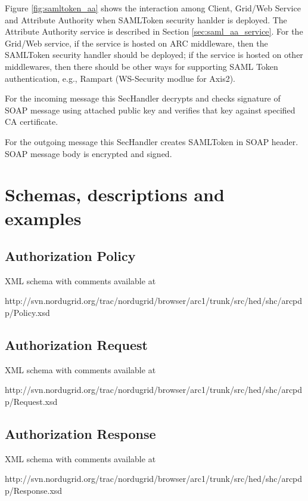 \documentclass{article}                            %
\begin{document}
Figure \ref{fig:samltoken_aa} shows the interaction among Client, Grid/Web Service and Attribute Authority when SAMLToken security hanlder is deployed. The Attribute Authority service is described in Section \ref{sec:saml_aa_service}. For the Grid/Web service, if the service is hosted on ARC middleware, then the SAMLToken security handler should be deployed; if the service is hosted on other middlewares, then there should be other ways for supporting SAML Token authentication, e.g., Rampart (WS-Security modlue for Axis2).

For the incoming message this SecHandler decrypts and checks signature of SOAP message using attached public key and verifies that key against specified CA certificate.

For the outgoing message this SecHandler creates SAMLToken in SOAP header. SOAP message body is encrypted and signed.




\section{Schemas, descriptions and examples} %
\label{sec:schema_description_example}

\subsection{Authorization Policy} %
\label{subsec:authz_policy}
XML schema with comments available at

http://svn.nordugrid.org/trac/nordugrid/browser/arc1/trunk/src/hed/shc/arcpdp/Policy.xsd

\subsection{Authorization Request} %
\label{subsec:authz_request}
XML schema with comments available at

http://svn.nordugrid.org/trac/nordugrid/browser/arc1/trunk/src/hed/shc/arcpdp/Request.xsd


\subsection{Authorization Response} %
\label{subsec:authz_response}
XML schema with comments available at

http://svn.nordugrid.org/trac/nordugrid/browser/arc1/trunk/src/hed/shc/arcpdp/Response.xsd
\end{document}
